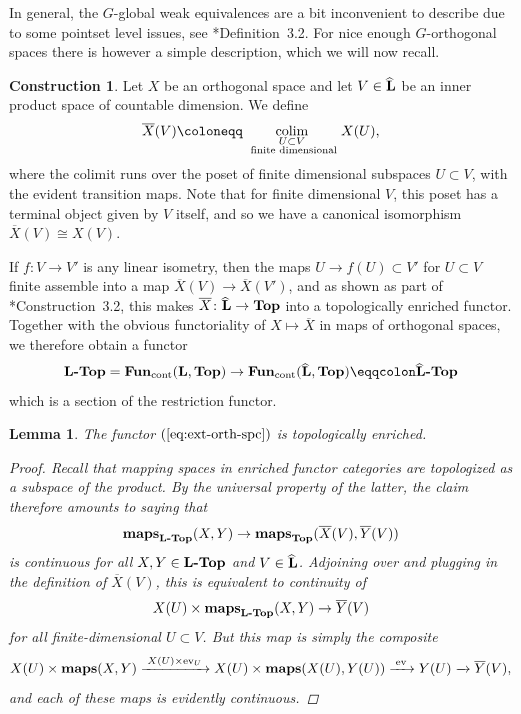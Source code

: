 \documentclass[reqno]{memo-l}
\theoremstyle{mythm}
\newtheorem{lemma}[thm]{Lemma}
\theoremstyle{definition}
\newtheorem{constr}[thm]{Construction}
\numberwithin{equation}{section}
\newcommand{\Lhat}{{\widehat{{\smash{\cat{L}}\vphantom{t}}\kern-1.75pt}\kern1.75pt}}
\DeclareMathOperator{\ev}{ev}
\newcommand{\cat}[1]{\textbf{\textup{#1}}}
\newcommand{\FUN}{\cat{Fun}}
\newcommand{\maps}{\cat{maps}}
\newcommand{\cont}{\textup{cont}}
\begin{document}
In general, the $G$-global weak equivalences are a bit inconvenient to describe due to some pointset level issues, see \cite{barrero2021}*{Definition~3.2}. For nice enough $G$-orthogonal spaces there is however a simple description, which we will now recall.

\begin{constr}\label{constr:ev-infty}
    Let $X$ be an orthogonal space and let $V\in\Lhat$ be an inner product space of countable dimension. We define
    \[
        \overline{X}(V)\coloneqq\mathop{\textup{colim}}\limits_{{\scriptstyle U\subset V}\atop\scriptstyle\textup{ finite dimensional}} X(U),
    \]
    where the colimit runs over the poset of finite dimensional subspaces $U\subset V$, with the evident transition maps. Note that for finite dimensional $V$, this poset has a terminal object given by $V$ itself, and so we have a canonical isomorphism $\overline{X}(V)\cong X(V)$.
    
    If $f\colon V\to V'$ is any linear isometry, then the maps $U\to f(U)\subset V'$ for $U\subset V$ finite assemble into a map $\overline{X}(V)\to\overline{X}(V')$, and as shown as part of \cite{schwede_orbispaces_2020}*{Construction~3.2}, this makes $\overline{X}\colon\Lhat\to\cat{Top}$ into a topologically enriched functor. Together with the obvious functoriality of $X\mapsto \overline{X}$ in maps of orthogonal spaces, we therefore obtain a functor
    \begin{equation}\label{eq:ext-orth-spc}
        \cat{$\cat L$-Top}=\FUN_\cont(\cat{L},\cat{Top})\to\FUN_\cont(\Lhat,\cat{Top})\eqqcolon\cat{$\Lhat$-Top}
    \end{equation}
    which is a section of the restriction functor. 
\end{constr}

\begin{lemma}
    The functor $(\ref{eq:ext-orth-spc})$ is topologically enriched.
    \begin{proof}
        Recall that mapping spaces in enriched functor categories are topologized as a subspace of the product. By the universal property of the latter, the claim therefore amounts to saying that
        \[
            \maps_{\cat{$\cat{L}$-Top}}(X,Y)\to\maps_{\cat{Top}}(\overline{X}(V),\overline{Y}(V))
        \]
        is continuous for all $X,Y\in\cat{$\cat{L}$-Top}$ and $V\in\Lhat$. Adjoining over and plugging in the definition of $\overline{X}(V)$, this is equivalent to continuity of
        \[X(U)\times\maps_{\cat{$\cat{L}$-Top}}(X,Y)\to \overline{Y}(V)\]
        for all finite-dimensional $U\subset V$. But this map is simply the composite
        \[
            X(U)\times\maps(X,Y)\xrightarrow{\;X(U)\times\ev_U\;}X(U)\times\maps(X(U),Y(U))\xrightarrow{\;\ev\;} Y(U)\xrightarrow{\;\;}\overline{Y}(V),
        \]
        and each of these maps is evidently continuous.
    \end{proof}
\end{lemma}
\end{document}
